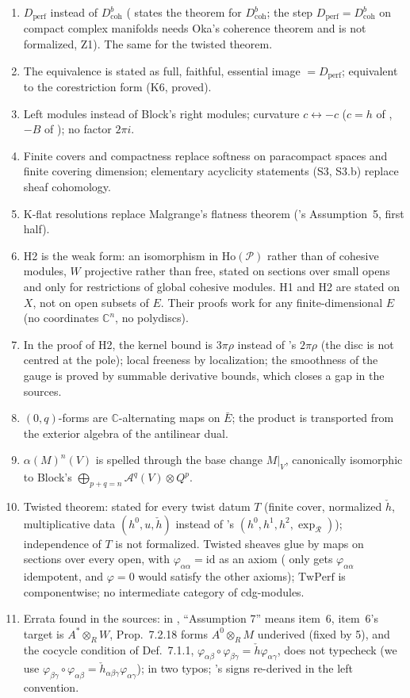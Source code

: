 \documentclass[11pt,a4paper]{article}
\newcommand{\cA}{\mathcal{A}}
\newcommand{\Ho}{\mathrm{Ho}}
\newcommand{\Dperf}{D_{\mathrm{perf}}}
\newcommand{\hc}{\check h}
\begin{document}
\begin{enumerate}
\item $\Dperf$ instead of $D^b_{\mathrm{coh}}$ (\cite{B} states the theorem for $D^b_{\mathrm{coh}}$; the step
$\Dperf=D^b_{\mathrm{coh}}$ on compact complex manifolds needs Oka's coherence theorem and is not
formalized, Z1). The same for the twisted theorem.
\item The equivalence is stated as full, faithful, essential image $=\Dperf$; equivalent to the
corestriction form (K6, proved).
\item Left modules instead of Block's right modules; curvature $c\leftrightarrow-c$ ($c=h$ of \cite{A},
$-B$ of \cite[\S4.2]{B}); no factor $2\pi i$.
\item Finite covers and compactness replace softness on paracompact spaces and finite covering
dimension; elementary acyclicity statements (S3, S3.b) replace sheaf cohomology.
\item K-flat resolutions replace Malgrange's flatness theorem (\cite{A}'s Assumption~5, first half).
\item H2 is the weak form: an isomorphism in $\Ho(\mathcal P)$ rather than of cohesive modules, $W$
projective rather than free, stated on sections over small opens and only for restrictions of
global cohesive modules. H1 and H2 are stated on $X$, not on open subsets of $E$. Their proofs
work for any finite-dimensional $E$ (no coordinates $\mathbb C^n$, no polydiscs).
\item In the proof of H2, the kernel bound is $3\pi\rho$ instead of \cite{DK}'s $2\pi\rho$ (the disc is
not centred at the pole); local freeness by localization; the smoothness of the gauge is proved
by summable derivative bounds, which closes a gap in the sources.
\item $(0,q)$-forms are $\mathbb C$-alternating maps on $\bar E$; the product is transported from the
exterior algebra of the antilinear dual.
\item $\alpha(M)^n(V)$ is spelled through the base change $M|_V$, canonically isomorphic to Block's
$\bigoplus_{p+q=n}\cA^q(V)\otimes Q^p$.
\item Twisted theorem: stated for every twist datum $T$ (finite cover, normalized $\hc$,
multiplicative data $(h^0,u,\hc)$ instead of \cite{A}'s $(h^0,h^1,h^2,\exp_{\mathcal R})$); independence
of $T$ is not formalized. Twisted sheaves glue by maps on sections over every open, with
$\varphi_{\alpha\alpha}=\mathrm{id}$ as an axiom (\cite{A} only gets $\varphi_{\alpha\alpha}$ idempotent, and
$\varphi=0$ would satisfy the other axioms); $\mathrm{TwPerf}$ is componentwise; no intermediate
category of cdg-modules.
\item Errata found in the sources: in \cite{A}, ``Assumption 7'' means item~6, item~6's target is
$A^*\otimes_RW$, Prop.~7.2.18 forms $A^0\otimes_RM$ underived (fixed by 5), and the cocycle
condition of Def.~7.1.1, $\varphi_{\alpha\beta}\circ\varphi_{\beta\gamma}=\hc\varphi_{\alpha\gamma}$, does
not typecheck (we use $\varphi_{\beta\gamma}\circ\varphi_{\alpha\beta}=\hc_{\alpha\beta\gamma}\varphi_{\alpha\gamma}$);
in \cite[proof of Lemma~3.2.8]{B} two typos; \cite{A}'s signs re-derived in the left convention.
\end{enumerate}
\end{document}

